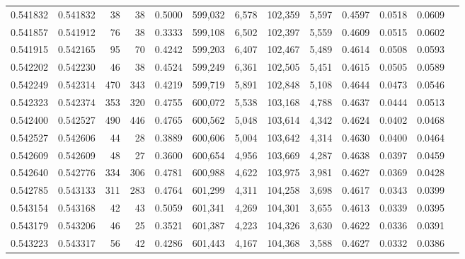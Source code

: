 \begin{tabular}{rrrrrrrrrrrrr}
0.541832 & 0.541832 &    38 &    38 &                                     0.5000 & 599,032 &   6,578 & 102,359 &   5,597 & 0.4597 & 0.0518 & 0.0609 \\
0.541857 & 0.541912 &    76 &    38 &                                     0.3333 & 599,108 &   6,502 & 102,397 &   5,559 & 0.4609 & 0.0515 & 0.0602 \\
0.541915 & 0.542165 &    95 &    70 &                                     0.4242 & 599,203 &   6,407 & 102,467 &   5,489 & 0.4614 & 0.0508 & 0.0593 \\
0.542202 & 0.542230 &    46 &    38 &                                     0.4524 & 599,249 &   6,361 & 102,505 &   5,451 & 0.4615 & 0.0505 & 0.0589 \\
0.542249 & 0.542314 &   470 &   343 &                                     0.4219 & 599,719 &   5,891 & 102,848 &   5,108 & 0.4644 & 0.0473 & 0.0546 \\
0.542323 & 0.542374 &   353 &   320 &                                     0.4755 & 600,072 &   5,538 & 103,168 &   4,788 & 0.4637 & 0.0444 & 0.0513 \\
0.542400 & 0.542527 &   490 &   446 &                                     0.4765 & 600,562 &   5,048 & 103,614 &   4,342 & 0.4624 & 0.0402 & 0.0468 \\
0.542527 & 0.542606 &    44 &    28 &                                     0.3889 & 600,606 &   5,004 & 103,642 &   4,314 & 0.4630 & 0.0400 & 0.0464 \\
0.542609 & 0.542609 &    48 &    27 &                                     0.3600 & 600,654 &   4,956 & 103,669 &   4,287 & 0.4638 & 0.0397 & 0.0459 \\
0.542640 & 0.542776 &   334 &   306 &                                     0.4781 & 600,988 &   4,622 & 103,975 &   3,981 & 0.4627 & 0.0369 & 0.0428 \\
0.542785 & 0.543133 &   311 &   283 &                                     0.4764 & 601,299 &   4,311 & 104,258 &   3,698 & 0.4617 & 0.0343 & 0.0399 \\
0.543154 & 0.543168 &    42 &    43 &                                     0.5059 & 601,341 &   4,269 & 104,301 &   3,655 & 0.4613 & 0.0339 & 0.0395 \\
0.543179 & 0.543206 &    46 &    25 &                                     0.3521 & 601,387 &   4,223 & 104,326 &   3,630 & 0.4622 & 0.0336 & 0.0391 \\
0.543223 & 0.543317 &    56 &    42 &                                     0.4286 & 601,443 &   4,167 & 104,368 &   3,588 & 0.4627 & 0.0332 & 0.0386 \\

\end{tabular}
